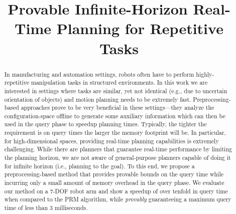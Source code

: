 \documentclass[letterpaper]{article} %
\begin{document}
%
\title{Provable Infinite-Horizon Real-Time Planning for Repetitive Tasks}
\maketitle

\begin{abstract}
In manufacturing and automation settings, robots often have to perform highly-repetitive manipulation tasks in structured environments. 
In this work we are interested in settings where tasks are similar, yet not identical (e.g., due to uncertain orientation of objects) and motion planning needs to be extremely fast. 
Preprocessing-based approaches prove to be very beneficial in these settings---they analyze the configuration-space offline to generate some auxiliary information which can then be used in the query phase to speedup planning times. 
%
Typically, the tighter the requirement is on query times the larger the memory footprint will be. In particular, for high-dimensional spaces, providing real-time planning capabilities is extremely challenging.
While there are planners that guarantee real-time performance by limiting the planning horizon, we are not aware of general-purpose planners capable of doing it for infinite horizon (i.e., planning to the goal).
%
To this end, we propose a preprocessing-based method that provides provable bounds on the query time while incurring only a small amount of memory overhead in the query phase.
We evaluate our method on a 7-DOF robot arm and show a speedup of over tenfold in query time when compared to the \textsf{PRM} algorithm, while \emph{provably} guaranteeing a maximum query time of less than 3 milliseconds.
\end{abstract}
\end{document}
